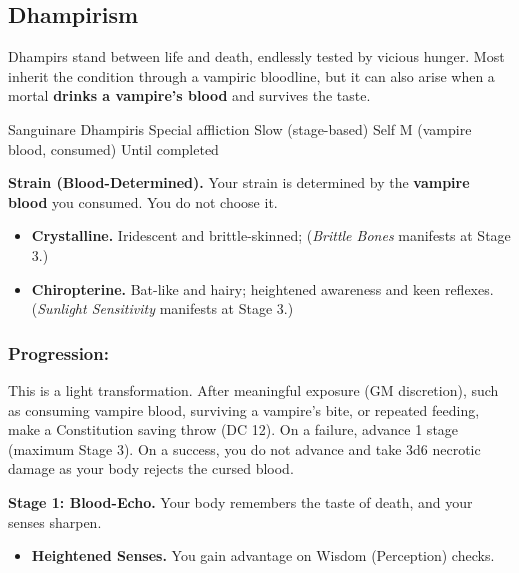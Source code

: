 \documentclass{apotheosis-book}
\begin{document}
\subsection{Dhampirism}

Dhampirs stand between life and death, endlessly tested by vicious hunger. Most inherit the condition through a vampiric bloodline, but it can also arise when a mortal \textbf{drinks a vampire's blood} and survives the taste.

\DndSpellHeader%
  {Sanguinare Dhampiris}
  {Special affliction}
  {Slow (stage-based)}
  {Self}
  {M (vampire blood, consumed)}
  {Until completed}

\textbf{Strain (Blood-Determined).} Your strain is determined by the \textbf{vampire blood} you consumed. You do not choose it.
\begin{itemize}
\item \textbf{Crystalline.} Iridescent and brittle-skinned; (\emph{Brittle Bones} manifests at Stage 3.)
\item \textbf{Chiropterine.} Bat-like and hairy; heightened awareness and keen reflexes. (\emph{Sunlight Sensitivity} manifests at Stage 3.)
\end{itemize}

\subsubsection{Progression:}
This is a light transformation. After meaningful exposure (GM discretion), such as consuming vampire blood, surviving a vampire's bite, or repeated feeding, make a Constitution saving throw (DC 12). On a failure, advance 1 stage (maximum Stage 3). On a success, you do not advance and take 3d6 necrotic damage as your body rejects the cursed blood.

\medskip

\textbf{Stage 1: Blood-Echo.}
Your body remembers the taste of death, and your senses sharpen.
\begin{itemize}
\item \textbf{Heightened Senses.} You gain advantage on Wisdom (Perception) checks.
\end{itemize}
\end{document}
